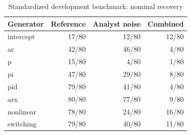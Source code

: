 \begin{table}[htbp]
\centering
\caption{Standardized development benchmark: nominal recovery}
\label{tab:m02-standardized-development}
\begin{tabular}{lrrr}
\toprule
Generator & Reference & Analyst noise & Combined \\
\midrule
intercept & 17/80 & 12/80 & 12/80 \\
ar & 42/80 & 46/80 & 4/80 \\
p & 15/80 & 4/80 & 1/80 \\
pi & 47/80 & 29/80 & 8/80 \\
pid & 79/80 & 41/80 & 4/80 \\
arx & 80/80 & 77/80 & 9/80 \\
nonlinear & 78/80 & 24/80 & 16/80 \\
switching & 79/80 & 40/80 & 11/80 \\
\bottomrule
\end{tabular}
\end{table}
